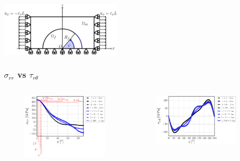 \documentclass[first,firstsupp,lastsupp,last,hyperref,table]{ETHclass}
\begin{document}
\begin{frame}
\begin{columns}[c]
\begin{column}{0.5\textwidth}
\begin{figure}
\end{figure}
\end{column}
\end{columns}
\vspace{-0.25cm}
\includegraphics[width=0.45\textwidth]{refAngle.pdf}
\end{frame}

\addtocounter{framenumber}{-1}

\begin{frame}
\frametitle{\vspace{0.2cm}\small $\sigma_{rr}$ vs $\tau_{r\theta}$}
\vspace{-.75cm}
\centering
\begin{columns}[c]
\centering
\begin{column}{0.5\textwidth}
\centering
\begin{figure}
\centering
\includegraphics[width=\columnwidth]{vf60-nodamage-sigmar.pdf}
\end{figure}
\end{column}
\begin{column}{0.5\textwidth}
\centering
\begin{figure}
\centering
\includegraphics[width=\columnwidth]{vf60-nodamage-taurt.pdf}

\end{figure}
\end{column}
\end{columns}
\end{frame}
\end{document}

